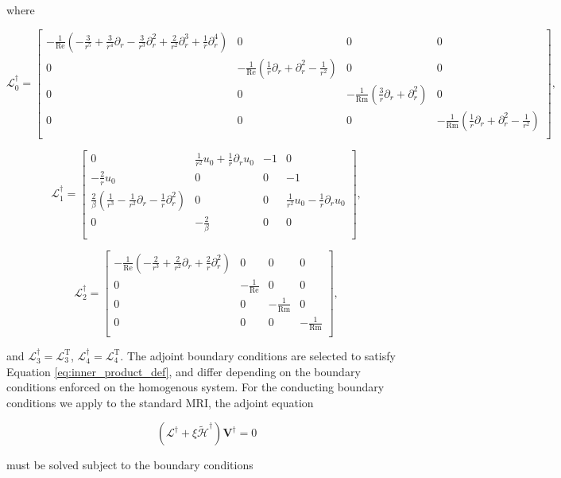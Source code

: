 \documentclass{emulateapj}
\newcommand{\beq}{\begin{equation}}
\newcommand{\eeq}{\end{equation}}
\newcommand\reye{\mathrm{Re}}
\newcommand\reym{\mathrm{Rm}}
\begin{document}
where 

\beq
\mathcal{L}_0^\dagger = \left[\begin{matrix}
-\frac{1}{\reye} (-\frac{3}{r^5} + \frac{3}{r^4}\partial_r - \frac{3}{r^3} \partial_r^2 + \frac{2}{r^2}\partial_r^3 + \frac{1}{r}\partial_r^4 ) & 0 & 0 & 0 \\
0 & -\frac{1}{\reye} (\frac{1}{r}\partial_r + \partial_r^2 - \frac{1}{r^2}) & 0 & 0 \\
0 & 0 &-\frac{1}{\reym} (\frac{3}{r}\partial_r + \partial_r^2) & 0 \\
0 & 0 & 0 & -\frac{1}{\reym} (\frac{1}{r}\partial_r + \partial_r^2 - \frac{1}{r^2}) \\
\end{matrix}\right],
\eeq

\beq
\mathcal{L}_1^\dagger = \left[\begin{matrix}
0 & \frac{1}{r^2} u_0 + \frac{1}{r}\partial_r u_0 & -1 & 0 \\
-\frac{2}{r}u_0 & 0 & 0 & -1 \\
\frac{2}{\beta}(\frac{1}{r^3} - \frac{1}{r^2}\partial_r - \frac{1}{r}\partial_r^2) & 0 & 0 & \frac{1}{r^2}u_0 - \frac{1}{r}\partial_r u_0 \\
0 & -\frac{2}{\beta} & 0 & 0 \\
\end{matrix}\right],
\eeq

\beq
\mathcal{L}_2^\dagger = \left[\begin{matrix}
-\frac{1}{\reye}(-\frac{2}{r^3} + \frac{2}{r^2}\partial_r + \frac{2}{r}\partial_r^2) & 0 & 0 & 0 \\
0 & -\frac{1}{\reye} & 0 & 0 \\
0 & 0 & -\frac{1}{\reym} & 0 \\
0 & 0 & 0 & -\frac{1}{\reym} \\
\end{matrix}\right],
\eeq

and $\mathcal{L}_3^\dagger = \mathcal{L}_3^\mathrm{T}$, $\mathcal{L}_4^\dagger = \mathcal{L}_4^\mathrm{T}$. The adjoint boundary conditions are selected to satisfy Equation \ref{eq:inner_product_def}, and differ depending on the boundary conditions enforced on the homogenous system. For the conducting boundary conditions we apply to the standard MRI, the adjoint equation 

\beq\label{eq:adjoint}
(\mathcal{L}^\dagger + \xi \widetilde{\mathcal{H}}^\dagger)\mathbf{V}^\dagger = 0
\eeq

must be solved subject to the boundary conditions
\end{document}
